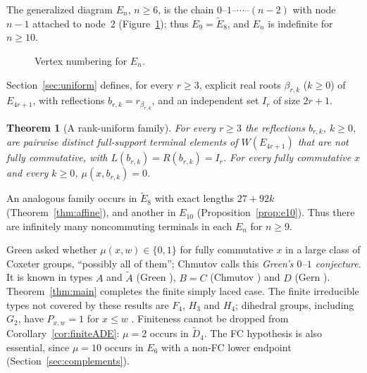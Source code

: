 \documentclass[10pt]{article}
\newtheorem{theorem}{Theorem}[section]
\theoremstyle{remark}
\begin{document}
The generalized diagram $E_n$, $n\geq6$, is the chain $0\text{--}1\text{--}\cdots\text{--}(n-2)$ with node $n-1$
attached to node~$2$ (Figure~\ref{fig:en-numbering}); thus
$E_9=\widetilde E_8$, and $E_n$ is indefinite for $n\geq10$.
\begin{figure}[htbp]
\centering
{}
\caption{Vertex numbering for $E_n$.}
\label{fig:en-numbering}
\end{figure}
Section~\ref{sec:uniform} defines, for every $r\geq3$,
explicit real roots $\beta_{r,k}$ ($k\geq0$) of $E_{4r+1}$, with
reflections $b_{r,k}=r_{\beta_{r,k}}$, and an independent set $I_r$ of
size $2r+1$.

\begin{theorem}[A rank-uniform family]\label{thm:uniform}
For every $r\geq3$ the reflections $b_{r,k}$, $k\geq0$, are pairwise
distinct full-support terminal elements of $W(E_{4r+1})$ that are not fully
commutative, with $L(b_{r,k})=R(b_{r,k})=I_r$. For every fully commutative
$x$ and every $k\geq0$, $\mu(x,b_{r,k})=0$.
\end{theorem}

An analogous family occurs in $\widetilde E_8$
with exact lengths $27+92k$ (Theorem~\ref{thm:affine}), and another in
$E_{10}$ (Proposition~\ref{prop:e10}). Thus there are infinitely many
noncommuting terminals in each $E_n$ for $n\geq9$.

Green \cite[Introduction]{GreenLeading} asked whether $\mu(x,w)\in\{0,1\}$
for fully commutative $x$ in a large class of Coxeter groups, ``possibly
all of them''; Chmutov \cite[abstract and \S2.3]{Chmutov} calls this
\emph{Green's $0$--$1$ conjecture}. It is known in types $A$ and
$\widetilde A$ (Green \cite[Theorem~4.1; Theorem~3.1 of the arXiv
version]{GreenLeading}), $B=C$ (Chmutov \cite[Theorem~2.3.8]{Chmutov}) and
$D$ (Gern \cite[Theorem~4.5.11]{Gern}). Theorem~\ref{thm:main} completes
the finite simply laced case. The finite irreducible types not covered by
these results are $F_4$, $H_3$ and $H_4$; dihedral groups, including
$G_2$, have $P_{x,w}=1$ for $x\leq w$
\cite[Proposition~7.3]{LusztigUP}. Finiteness cannot be dropped from
Corollary~\ref{cor:finiteADE}: $\mu=2$ occurs in $\widetilde D_4$.
The FC hypothesis is also essential, since $\mu=10$ occurs in $E_6$
with a non-FC lower endpoint (Section~\ref{sec:complements}).
\end{document}
